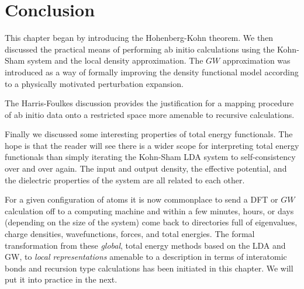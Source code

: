 \section{Conclusion}
\noindent
This chapter began by introducing the Hohenberg-Kohn theorem. 
We then discussed the practical means of performing
ab initio calculations using the Kohn-Sham system and the local density
approximation. The $GW$ approximation was introduced as a way of formally
improving the density functional model according to a physically motivated
perturbation expansion.

The Harris-Foulkes discussion provides the justification for a mapping procedure
of ab initio data onto a restricted space more amenable to recursive
calculations.

Finally we discussed some interesting properties of total 
energy functionals. The hope is that the reader will see there is a wider
scope for interpreting total energy functionals than simply iterating the Kohn-Sham LDA
system to self-consistency over and over again. The input and output density, 
the effective potential, and the dielectric properties of the system are all 
related to each other.

For a given configuration of atoms it is now commonplace to send a 
DFT or $GW$ calculation off to a computing machine and within a few minutes, hours, or 
days (depending on the size of the system) come back to directories 
full of eigenvalues, charge densities, wavefunctions, forces, and total energies.
The formal transformation from these  \textit{global}, total energy methods 
based on the LDA and GW, to \textit{local representations} amenable 
to a description in terms of interatomic bonds and 
recursion type calculations has been initiated in this chapter. We
will put it into practice in the next.

